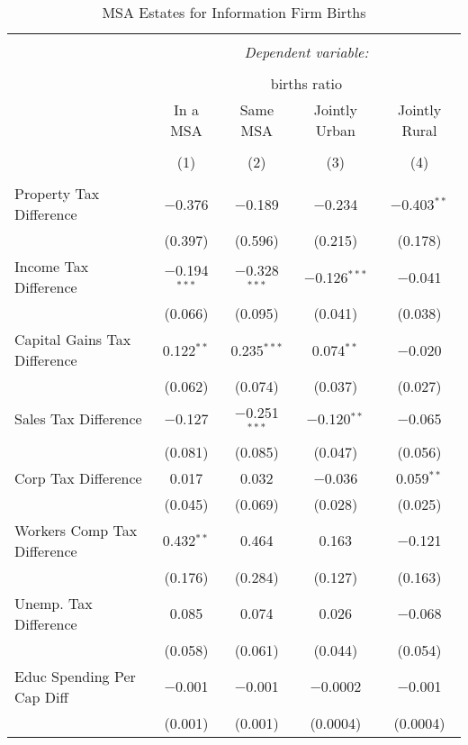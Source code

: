 
\begin{table}[!htbp] \centering 
  \caption{MSA Estates for  Information Firm Births} 
  \label{51metro} 
\begin{tabular}{@{\extracolsep{5pt}}lcccc} 
\\[-1.8ex]\hline 
\hline \\[-1.8ex] 
 & \multicolumn{4}{c}{\textit{Dependent variable:}} \\ 
\cline{2-5} 
\\[-1.8ex] & \multicolumn{4}{c}{births ratio} \\ 
 & In a MSA & Same MSA & Jointly Urban & Jointly Rural \\ 
\\[-1.8ex] & (1) & (2) & (3) & (4)\\ 
\hline \\[-1.8ex] 
 Property Tax Difference & $-$0.376 & $-$0.189 & $-$0.234 & $-$0.403$^{**}$ \\ 
  & (0.397) & (0.596) & (0.215) & (0.178) \\ 
  Income Tax Difference & $-$0.194$^{***}$ & $-$0.328$^{***}$ & $-$0.126$^{***}$ & $-$0.041 \\ 
  & (0.066) & (0.095) & (0.041) & (0.038) \\ 
  Capital Gains Tax Difference & 0.122$^{**}$ & 0.235$^{***}$ & 0.074$^{**}$ & $-$0.020 \\ 
  & (0.062) & (0.074) & (0.037) & (0.027) \\ 
  Sales Tax Difference & $-$0.127 & $-$0.251$^{***}$ & $-$0.120$^{**}$ & $-$0.065 \\ 
  & (0.081) & (0.085) & (0.047) & (0.056) \\ 
  Corp Tax Difference & 0.017 & 0.032 & $-$0.036 & 0.059$^{**}$ \\ 
  & (0.045) & (0.069) & (0.028) & (0.025) \\ 
  Workers Comp Tax Difference & 0.432$^{**}$ & 0.464 & 0.163 & $-$0.121 \\ 
  & (0.176) & (0.284) & (0.127) & (0.163) \\ 
  Unemp. Tax Difference & 0.085 & 0.074 & 0.026 & $-$0.068 \\ 
  & (0.058) & (0.061) & (0.044) & (0.054) \\ 
  Educ Spending Per Cap Diff & $-$0.001 & $-$0.001 & $-$0.0002 & $-$0.001 \\ 
  & (0.001) & (0.001) & (0.0004) & (0.0004) \\ 

\end{tabular}
\end{table}
